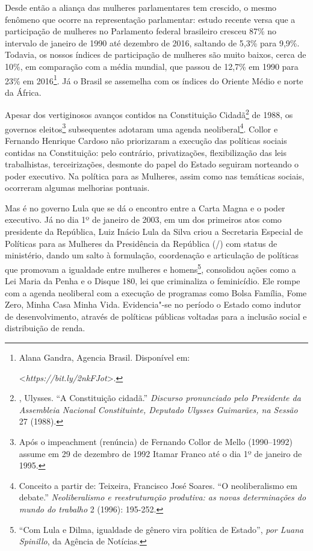 Desde então a aliança das mulheres parlamentares tem crescido, o mesmo
fenômeno que ocorre na representação parlamentar: estudo recente versa que a
participação de mulheres no Parlamento federal brasileiro cresceu 87\%
no intervalo de janeiro de 1990 até dezembro de 2016, saltando de 5,3\%
para 9,9\%. Todavia, os nossos índices de participação de mulheres são
muito baixos, cerca de 10\%, em comparação com a média mundial, que
passou de 12,7\% em 1990 para 23\% em 2016\footnote{Alana Gandra,
  Agencia Brasil. Disponível em: 

  \textless{}\emph{https://bit.ly/2nkFJot}\textgreater{}.}.
Já o Brasil se assemelha com os índices do Oriente Médio e norte da África.

Apesar dos vertiginosos avanços contidos na Constituição Cidadã\footnote{,
  Ulysses. ``A Constituição cidadã.'' \emph{Discurso pronunciado pelo
  Presidente da Assembleia Nacional Constituinte, Deputado Ulysses
  Guimarães, na Sessão} 27 (1988).} de 1988, os governos
eleitos\footnote{Após o impeachment (renúncia) de Fernando Collor de Mello
  (1990--1992) assume em 29 de dezembro de 1992 Itamar Franco até o
  dia 1º de janeiro de 1995.}
subsequentes adotaram uma agenda neoliberal\footnote{Conceito a partir de:
  Teixeira, Francisco José Soares. ``O neoliberalismo em
      debate.'' \emph{Neoliberalismo e reestruturação produtiva: as novas
  determinações do mundo do trabalho} 2 (1996): 195-252.}. Collor e
Fernando Henrique Cardoso não priorizaram a execução das políticas
sociais contidas na Constituição: pelo contrário, privatizações,
flexibilização das leis trabalhistas, terceirizações, desmonte do papel
do Estado seguiram norteando o poder executivo. Na política para as
Mulheres, assim como nas temáticas sociais, ocorreram algumas melhorias
pontuais.

Mas é no governo Lula que se dá o encontro entre a Carta Magna e o poder
executivo. Já no dia 1º de janeiro de 2003, em um dos primeiros atos como
presidente da República, Luiz Inácio Lula da Silva criou
a Secretaria Especial de Políticas para as
Mulheres da Presidência da República (/) com status de ministério,
dando um salto à formulação, coordenação e articulação de políticas que
promovam a igualdade entre mulheres e homens\footnote{``Com Lula e Dilma, igualdade de gênero vira política de Estado'', \emph{por Luana Spinillo}, da Agência  de
  Notícias.}, consolidou ações como a Lei Maria da Penha
e o Disque 180, lei que criminaliza o feminicídio. Ele rompe com a
agenda neoliberal com a execução de programas como Bolsa Família, Fome
Zero, Minha Casa Minha Vida. Evidencia"-se no período o Estado como
indutor de desenvolvimento, através de políticas públicas voltadas para
a inclusão social e distribuição de renda.

